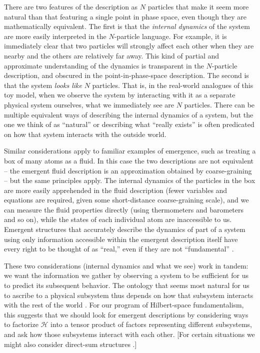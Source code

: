 \documentclass[12pt,english]{article}
\newcommand{\HH}{\mathcal{H}}
\begin{document}
There are two features of the description as $N$ particles that make it seem more natural than that featuring a single point in phase space, even though they are mathematically equivalent.
The first is that the \emph{internal dynamics} of the system are more easily interpreted in the $N$-particle language.
For example, it is immediately clear that two particles will strongly affect each other when they are nearby and the others are relatively far away. 
This kind of partial and approximate understanding of the dynamics is transparent in the $N$-particle description, and obscured in the point-in-phase-space description.
The second is that the system \emph{looks like} $N$ particles.
That is, in the real-world analogues of this toy model, when we observe the system by interacting with it as a separate physical system ourselves, what we immediately see are $N$ particles. 
There can be multiple equivalent ways of describing the internal dynamics of a system, but the one we think of as ``natural'' or describing what ``really exists'' is often predicated on how that system interacts with the outside world. 

Similar considerations apply to familiar examples of emergence, such as treating a box of many atoms as a fluid.
In this case the two descriptions are not equivalent -- the emergent fluid description is an approximation obtained by coarse-graining -- but the same principles apply.
The internal dynamics of the particles in the box are more easily apprehended in the fluid description (fewer variables and equations are required, given some short-distance coarse-graining scale), and we can measure the fluid properties directly (using thermometers and barometers and so on), while the states of each individual atom are inaccessible to us.
Emergent structures that accurately describe the dynamics of part of a system using only information accessible within the emergent description itself have every right to be thought of as ``real,'' even if they are not ``fundamental'' \citep{dennett1991real,wallace2012emergent}.

These two considerations (internal dynamics and what we see) work in tandem: we want the information we gather by observing a system to be sufficient for us to predict its subsequent behavior.
The ontology that seems most natural for us to ascribe to a physical subsystem thus depends on how that subsystem interacts with the rest of the world \citep{Zanardi:2004zz}.
For our program of Hilbert-space fundamentalism, this suggests that we should look for emergent descriptions by considering ways to factorize $\HH$ into a tensor product of factors representing different subsystems, and ask how those subsystems interact with each other.
[For certain situations we might also consider direct-sum structures \citep{Kabernik:2019jko}.]
\end{document}
